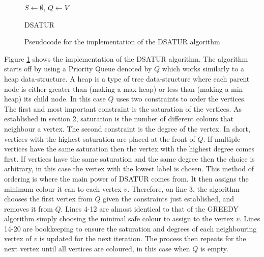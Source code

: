 \begin{figure}[H]
    \centering
        \begin{algorithm}[H]
        \DontPrintSemicolon
        
        \BlankLine

        $S \leftarrow \emptyset$,
        $Q \leftarrow V$ \;
    
        \caption{DSATUR}
        \end{algorithm}
    \caption{Pseudocode for the implementation of the DSATUR algorithm}
    \label{fig:DSATURImpPseudo}
\end{figure}

Figure \ref{fig:DSATURImpPseudo} shows the implementation of the DSATUR algorithm. The algorithm starts off by using a Priority Queue denoted by $Q$ which works similarly to a heap data-structure. A heap is a type of tree data-structure where each parent node is either greater than (making a max heap) or less than (making a min heap) its child node. In this case $Q$ uses two constraints to order the vertices. The first and most important constraint is the saturation of the vertices. As established in section 2, saturation is the number of different colours that neighbour a vertex. The second constraint is the degree of the vertex. In short, vertices with the highest saturation are placed at the front of $Q$. If multiple vertices have the same saturation then the vertex with the highest degree comes first. If vertices have the same saturation and the same degree then the choice is arbitrary, in this case the vertex with the lowest label is chosen. This method of ordering is where the main power of DSATUR comes from. It then assigns the minimum colour it can to each vertex $v$. Therefore, on line 3, the algorithm chooses the first vertex from $Q$ given the constraints just established, and removes it from $Q$. Lines 4-12 are almost identical to that of the GREEDY algorithm simply choosing the minimal safe colour to assign to the vertex $v$. Lines 14-20 are bookkeeping to ensure the saturation and degrees of each neighbouring vertex of $v$ is updated for the next iteration. The process then repeats for the next vertex until all vertices are coloured, in this case when $Q$ is empty. 


